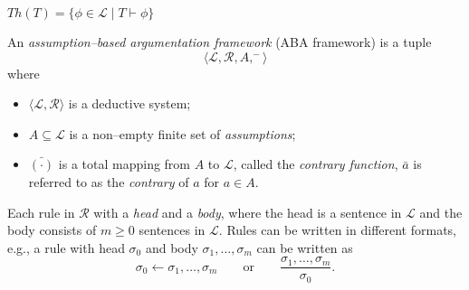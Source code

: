 $Th(T) = \{\phi \in \mathcal{L} \mid T \vdash \phi\}$


An \textit{assumption--based argumentation framework} (ABA framework) is a tuple 
\[
 \langle \mathcal{L}, \mathcal{R}, A, ^- \rangle
\] 
where 
\begin{itemize}[itemsep=5pt,parsep=5pt,leftmargin=3em,topsep=5pt]
    \item 
    $\langle \mathcal{L}, \mathcal{R} \rangle$ is a deductive system;

    \item 
    $A \subseteq \mathcal{L}$ is a non--empty finite set of \textit{assumptions}; 

    \item 
    $\bar{(\cdot)}$ is a total mapping from $A$ to $\mathcal{L}$, 
    called the \textit{contrary function}, 
    {\color{purple} $\bar{a}$} is referred to as the \textit{contrary} of $a$ for $a \in A$.
\end{itemize}



Each rule in $\mathcal{R}$ with a \textit{head} and a \textit{body}, 
where the head is a sentence in $\mathcal{L}$ and the body consists of $m \geq 0$ sentences in $\mathcal{L}$.
% 
Rules can be written in different formats, 
e.g., 
a rule with head $\sigma_0$ and body $\sigma_1, \ldots, \sigma_m$ can be written as 
\[
\sigma_0 \leftarrow \sigma_1, \ldots, \sigma_m 
\qquad \text{or} \qquad
\dfrac{\sigma_1, \dots,\sigma_m}{\sigma_0}.
\]





